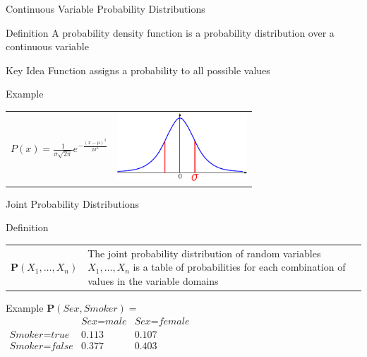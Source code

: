 \documentclass[14pt]{beamer}
\begin{document}
\begin{frame}{Continuous Variable Probability Distributions}
	\begin{block}{Definition}
		A \alert{probability density function} is a probability distribution over a continuous variable
	\end{block}
	\begin{block}{Key Idea}
		Function assigns a probability to all possible values
	\end{block}
	\pause
	\begin{block}{Example}
		\begin{tabular}{lr}
			\large $P(x) = \frac{1}{\sigma\sqrt{2\pi}}e^{-\frac{(x - \mu)^{2}}{2\sigma^{2}}}$ 
			&
			\parbox{2in}{\includegraphics[height=1in]{gaussian-density}}
		\end{tabular}
	\end{block}
\end{frame}
\begin{frame}{Joint Probability Distributions}
	\begin{block}{Definition}
		\begin{tabular}{@{}lm{2.85in}@{}}
			\large $\mathbf{P}(X_1, \ldots, X_n)$
			&
			The \alert{joint probability distribution} of random variables $X_1, \ldots, X_n$ is a table of probabilities for each combination of values in the variable domains
		\end{tabular}
	\end{block}
	\pause
	\begin{block}{Example}
		$\mathbf{P}(\textit{Sex},\textit{Smoker}) = \mbox{}$ \\[.25em]
		\tab
		$
		\begin{array}{lcc}
			                           & \textit{Sex}=\textit{male} & \textit{Sex}=\textit{female} \\
			\textit{Smoker}=\textit{true}  & 0.113                  & 0.107 \\
			\textit{Smoker}=\textit{false} & 0.377                  & 0.403 \\
		\end{array}
		$
	\end{block}
\end{frame}
\end{document}
